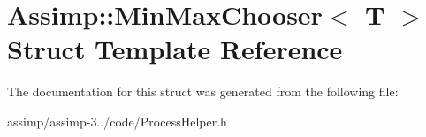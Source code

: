 \hypertarget{struct_assimp_1_1_min_max_chooser}{\section{Assimp\+:\+:Min\+Max\+Chooser$<$ T $>$ Struct Template Reference}
\label{struct_assimp_1_1_min_max_chooser}
}


The documentation for this struct was generated from the following file\+:\begin{DoxyCompactItemize}
\item 
assimp/assimp-\/3../code/Process\+Helper.\+h\end{DoxyCompactItemize}
